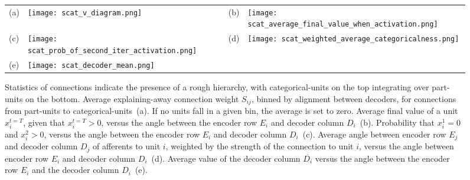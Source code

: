 \documentclass{article} %
\begin{document}
\begin{figure}[ptb] %
  \begin{center}
    \begin{tabular}{p{0.04in}p{2.4in}p{0.04in}p{2.4in}}
      \parbox[b]{0in}{(a) \vspace{3.8cm}} & \texttt{[image: scat\_v\_diagram.png]} &
      \parbox[b]{0in}{(b) \vspace{3.8cm}} & \texttt{[image: scat\_average\_final\_value\_when\_activation.png]} \\
      \parbox[b]{0in}{(c) \vspace{3.8cm}} & \texttt{[image: scat\_prob\_of\_second\_iter\_activation.png]} &
      \parbox[b]{0in}{(d) \vspace{3.8cm}} & \texttt{[image: scat\_weighted\_average\_categoricalness.png]} \\
      \parbox[b]{0in}{(e) \vspace{3.8cm}} & \texttt{[image: scat\_decoder\_mean.png]}
    \end{tabular}
  \end{center}
  \caption{Statistics of connections indicate the presence of a rough hierarchy, with categorical-units on the top integrating %
    over part-units on the bottom. Average explaining-away connection weight $S_{ij}$, binned by alignment between decoders, for connections from part-units to categorical-units~(a).  If no units fall in a given bin, the average is set to zero. Average final value of a unit $x_i^{t = T}$, given that $x_i^{t=T} > 0$, versus the angle between the encoder row $E_i$ and decoder column $D_i$~(b).  Probability that $x_i^1 = 0$ and $x_i^2 > 0$, versus the angle between the encoder row $E_i$ and decoder column $D_i$~(c).  Average angle between encoder row $E_j$ and decoder column $D_j$ of afferents to unit $i$, weighted by the strength of the connection to unit $i$, versus the angle between encoder row $E_i$ and decoder column $D_i$~(d). Average value of the decoder column $\overline{D_i}$ versus the angle between the encoder row $E_i$ and the decoder column $D_i$~(e). \label{categorical_connection_statistics_figure}}  
\end{figure}

\begin{comment}
\begin{figure}[ptb] %
  \begin{center}
    \begin{tabular}{cc}
      \texttt{[image: scat\_decoder\_mean.png]} &
      \texttt{[image: scat\_class\_dict\_mag\_versus\_final\_activation.png]}
    \end{tabular}
  \end{center}
  \caption{Statistics for interpretation. \label{interpretation_statistics_figure}}
\end{figure}
\end{comment}
\end{document}
